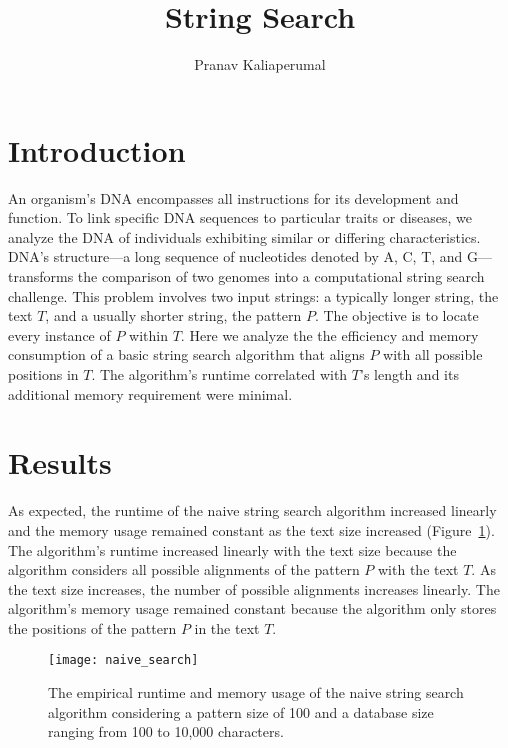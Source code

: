 \documentclass[11pt, letterpaper]{article}
\begin{document}
\title{String Search}
\author{Pranav Kaliaperumal}
\maketitle

\section{Introduction}
An organism's DNA encompasses all instructions for its development and
function. To link specific DNA sequences to particular traits or diseases, we
analyze the DNA of individuals exhibiting similar or differing characteristics.
DNA's structure—a long sequence of nucleotides denoted by A, C, T, and
G—transforms the comparison of two genomes into a computational string search
challenge. This problem involves two input strings: a typically longer string,
the text $T$, and a usually shorter string, the pattern $P$. The
objective is to locate every instance of $P$ within $T$. Here we analyze the
the efficiency and memory consumption of a basic string search algorithm that
aligns $P$ with all possible positions in $T$. The algorithm's runtime
correlated with $T$'s length and its additional memory requirement were
minimal.

\section{Results}

As expected, the runtime of the naive string search algorithm increased
linearly and the memory usage remained constant as the text size increased
(Figure~\ref{timeandmem}). The algorithm's runtime increased linearly with
the text size because the algorithm considers all possible alignments of the
pattern $P$ with the text $T$. As the text size increases, the number of
possible alignments increases linearly. The algorithm's memory usage remained
constant because the algorithm only stores the positions of the pattern $P$ in
the text $T$.


\begin{figure}[ht] \centering
    \texttt{[image: naive\_search]}
    \caption{The empirical runtime and memory usage of the naive string search
    algorithm considering a pattern size of 100 and a database size ranging
    from 100 to 10,000 characters.}
    \label{timeandmem}
\end{figure}
\end{document}
